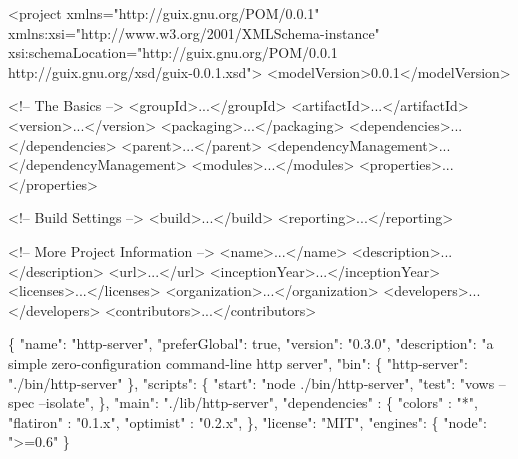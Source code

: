 \documentclass{beamer}
\begin{document}
\begin{frame}
  \begin{semiverbatim}
    \footnotesize{
<project xmlns="http://guix.gnu.org/POM/0.0.1"
  xmlns:xsi="http://www.w3.org/2001/XMLSchema-instance"
  xsi:schemaLocation="http://guix.gnu.org/POM/0.0.1
                      http://guix.gnu.org/xsd/guix-0.0.1.xsd">
  <modelVersion>0.0.1</modelVersion>

  <!-- The Basics -->
  <groupId>...</groupId>
  <artifactId>...</artifactId>
  <version>...</version>
  <packaging>...</packaging>
  <dependencies>...</dependencies>
  <parent>...</parent>
  <dependencyManagement>...</dependencyManagement>
  <modules>...</modules>
  <properties>...</properties>

  <!-- Build Settings -->
  <build>...</build>
  <reporting>...</reporting>

  <!-- More Project Information -->
  <name>...</name>
  <description>...</description>
  <url>...</url>
  <inceptionYear>...</inceptionYear>
  <licenses>...</licenses>
  <organization>...</organization>
  <developers>...</developers>
  <contributors>...</contributors>
}
  \end{semiverbatim}
\end{frame}

\begin{frame}
  \begin{semiverbatim}
    \footnotesize{
\{
  "name": "http-server",
  "preferGlobal": true,
  "version": "0.3.0",
  "description": "a simple zero-configuration command-line http server",
  "bin": \{
    "http-server": "./bin/http-server"
  \},
  "scripts": \{
    "start": "node ./bin/http-server",
    "test": "vows --spec --isolate",
  \},
  "main": "./lib/http-server",
  "dependencies" : \{
    "colors"   :  "*",
    "flatiron" :  "0.1.x",
    "optimist" :  "0.2.x",
  \},
  "license": "MIT",
  "engines": \{
    "node": ">=0.6"
  \}
}
  \end{semiverbatim}
\end{frame}

\begin{frame}[plain]
\end{frame}
\end{document}
